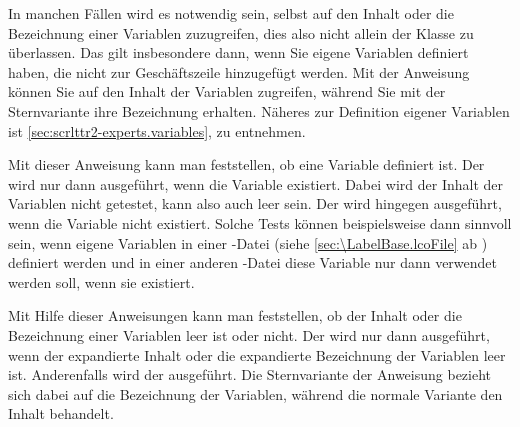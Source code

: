 \begin{Declaration}
\end{Declaration}
In manchen Fällen wird es notwendig sein,
selbst auf den Inhalt oder die Bezeichnung einer Variablen zuzugreifen, dies
also nicht allein der Klasse zu überlassen. Das gilt insbesondere dann, wenn
Sie eigene Variablen definiert haben, die nicht zur Geschäftszeile
hinzugefügt werden.  Mit der Anweisung  können Sie auf den
Inhalt der Variablen  zugreifen, während Sie mit der Sternvariante
 ihre Bezeichnung erhalten. Näheres zur Definition eigener
Variablen ist \autoref{sec:scrlttr2-experts.variables},
 zu entnehmen.%
\EndIndexGroup


\begin{Declaration}
\end{Declaration}
Mit dieser Anweisung kann man feststellen,
ob eine Variable definiert ist. Der  wird nur dann
ausgeführt, wenn die Variable existiert. Dabei wird der Inhalt der Variablen
nicht getestet, kann also auch leer sein. Der  wird hingegen
ausgeführt, wenn die Variable nicht existiert. Solche Tests können
beispielsweise dann sinnvoll sein, wenn eigene Variablen in einer
-Datei (siehe
\autoref{sec:\LabelBase.lcoFile} ab )
definiert werden und in einer anderen -Datei diese Variable nur dann
verwendet werden soll, wenn sie existiert.
\EndIndexGroup


\begin{Declaration}
\end{Declaration}
Mit Hilfe dieser Anweisungen kann man
feststellen, ob der Inhalt oder die Bezeichnung einer Variablen leer
ist oder nicht. Der  wird nur dann ausgeführt,
wenn der expandierte Inhalt oder die expandierte Bezeichnung der
Variablen  leer ist. Anderenfalls wird der
 ausgeführt.  Die Sternvariante der Anweisung
bezieht sich dabei auf die Bezeichnung der Variablen, während die
normale Variante den Inhalt behandelt.%
\EndIndexGroup
%
\EndIndexGroup


